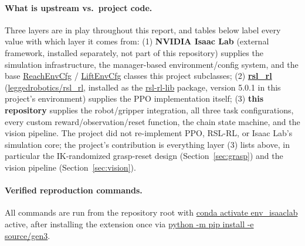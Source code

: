 \documentclass[11pt]{article}
\begin{document}
\paragraph{What is upstream vs.\ project code.} Three layers are in play throughout
this report, and tables below label every value with which layer it comes from:
(1) \textbf{NVIDIA Isaac Lab} (external framework, installed separately, not part of
this repository) supplies the simulation infrastructure, the manager-based
environment/config system, and the base \url{ReachEnvCfg} / \url{LiftEnvCfg}
classes this project subclasses; (2) \textbf{\url{rsl_rl}}
(\href{https://github.com/leggedrobotics/rsl_rl}{\url{leggedrobotics/rsl_rl}},
installed as the \url{rsl-rl-lib} package, version 5.0.1 in this project's
environment) supplies the PPO implementation itself; (3) \textbf{this repository}
supplies the robot/gripper integration, all three task configurations, every custom
reward/observation/reset function, the chain state machine, and the vision pipeline.
The project did not re-implement PPO, RSL-RL, or Isaac Lab's simulation core; the
project's contribution is everything layer (3) lists above, in particular the
IK-randomized grasp-reset design (Section~\ref{sec:grasp}) and the vision pipeline
(Section~\ref{sec:vision}).

\paragraph{Verified reproduction commands.} All commands are run from the repository
root with \url{conda activate env_isaaclab} active, after installing the
extension once via \url{python -m pip install -e source/gen3}.
\end{document}
